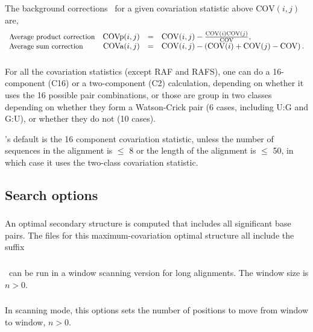 The background corrections~\citep{DunnGloor07} for a given
covariation statistic above $\mathrm{COV}(i,j)$ are,
%
\[
\begin{array}{lrcl}
  \mbox{\small Average product correction} & \mathrm{COVp}(i,j) & = &  \mathrm{COV}(i,j) - \frac { \mathrm{COV}(i) \mathrm{COV}(j) } { \mathrm{COV} }, \\
  \mbox{\small Average sum correction}     & \mathrm{COVa}(i,j) & = &  \mathrm{COV}(i,j) - \left( \mathrm{COV}(i) + \mathrm{COV}(j) - \mathrm{COV} \right). \\
\end{array}
\]



\subsubsection{}
For all the covariation statistics (except RAF and RAFS), one can do a
16-component (C16) or a two-component (C2) calculation, depending on
whether it uses the 16 possible pair combinations, or those are group
in two classes depending on whether they form a Watson-Crick pair (6
cases, including U:G and G:U), or whether they do not (10 cases).

\rscape's default is the 16 component covariation statistic, unless
the number of sequences in the alignment is $\leq$ 8 or the length of
the alignment is $\leq$ 50, in which case it uses the two-class
covariation statistic.

\subsection{Search options}

\subsubsection{} An optimal secondary structure is computed that includes all significant base pairs. The files for this
maximum-covariation optimal structure all include the suffix


\subsubsection{} \rscape\ can be run in a window scanning version for long alignments.
The window size is $n>0$.

\subsubsection{} In scanning mode, this options sets the number of positions to move from window to window, $n >0$.


